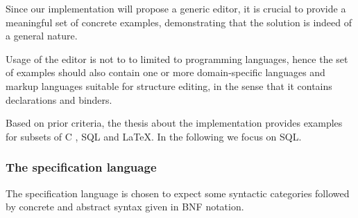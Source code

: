 \documentclass[sigplan,review]{acmart}
\begin{document}
Since our implementation will propose a generic editor, it is crucial
to provide a meaningful set of concrete examples, demonstrating that
the solution is indeed of a general nature.  %
 

Usage of the editor is not to to limited to programming languages,
hence the set of examples should also contain one or more
domain-specific languages and markup languages suitable for structure
editing, in the sense that it contains declarations and binders.

Based on prior criteria, the thesis about the
implementation\cite{sunemsc} provides examples for subsets of C
\cite{c-iso-standard}, SQL\cite{postgresql-about} and
\LaTeX\cite{latex-about}. In the following we focus on SQL.




\subsubsection{The specification language}

The specification language is chosen to expect some syntactic
categories followed by concrete and abstract syntax given in BNF notation.
\end{document}
